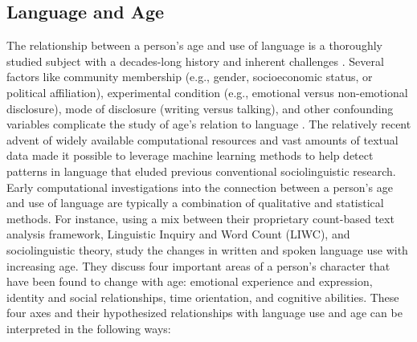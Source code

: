 \subsection{Language and Age}\label{subsec:background_lang_age}
The relationship between a person's age and use of language is a thoroughly studied subject with a decades-long history and inherent challenges \citep{pennebaker2003words, nguyen2014gender, zheng2019personalized}. Several factors like community membership (e.g., gender, socioeconomic status, or political affiliation), experimental condition (e.g., emotional versus non-emotional disclosure), mode of disclosure (writing versus talking), and other confounding variables complicate the study of age's relation to language \citep{nguyen-etal-2011-author}. The relatively recent advent of widely available computational resources and vast amounts of textual data made it possible to leverage machine learning methods to help detect patterns in language that eluded previous conventional sociolinguistic research. Early computational investigations into the connection between a person's age and use of language are typically a combination of qualitative and statistical methods. For instance, using a mix between their proprietary count-based text analysis framework, Linguistic Inquiry and Word Count (LIWC), and sociolinguistic theory, \cite{pennebaker2003words} study the changes in written and spoken language use with increasing age. They discuss four important areas of a person's character that have been found to change with age: emotional experience and expression, identity and social relationships, time orientation, and cognitive abilities. These four axes and their hypothesized relationships with language use and age can be interpreted in the following ways:
